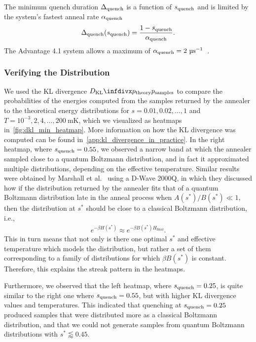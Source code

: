 The minimum quench duration \( \Delta_{\text{quench}} \) is a function of \( s_{\text{quench}} \) and is limited by the system's fastest anneal rate \( \alpha_{\text{quench}} \)
\begin{align}
    \Delta_{\text{quench}}(s_{\text{quench}}) = \frac{1 - s_{\text{quench}}}{\alpha_{\text{quench}}}.
\end{align}
The Advantage 4.1 system allows a maximum of \( \alphaquench = 2 \ \si{\micro\second}^{-1} \)~\cite{dwave_solver_parameters}.

\subsubsection{Verifying the Distribution}
We used the KL divergence \( \DKL{\ptheory}{\psamples} \) to compare the probabilities of the energies computed from the samples returned by the annealer to the theoretical energy distributions for \( s = 0.01, 0.02, \dots, 1 \) and \( T = 10^{-3}, 2, 4, \dots, 200 \ \si{\milli\kelvin} \), which we visualized as heatmaps in~\cref{fig:dkl_min_heatmap}.
More information on how the KL divergence was computed can be found in~\cref{app:kl_divergence_in_practice}.
In the right heatmap, where \( s_{\text{quench}} = 0.55 \), we observed a narrow band at which the annealer sampled close to a quantum Boltzmann distribution, and in fact it approximated multiple distributions, depending on the effective temperature.
Similar results were obtained by Marshall et al.~\cite{marshall_2019} using a D-Wave 2000Q, in which they discussed how if the distribution returned by the annealer fits that of a quantum Boltzmann distribution late in the anneal process when \( A(s^*) / B(s^*) \ll 1 \), then the distribution at \( s^* \) should be close to a classical Boltzmann distribution, i.e.,
\begin{align}
    e^{-\beta H(s^*)} \approx e^{-\beta B(s^*) H_\text{final}}.
\end{align}
This in turn means that not only is there one optimal \( s^* \) and effective temperature which models the distribution, but rather a set of them corresponding to a family of distributions for which \( \beta B(s^*) \) is constant.
Therefore, this explains the streak pattern in the heatmaps.

Furthermore, we observed that the left heatmap, where \( s_{\text{quench}} = 0.25 \), is quite similar to the right one where \( s_{\text{quench}} = 0.55 \), but with higher KL divergence values and temperatures.
This indicated that quenching at \( s_{\text{quench}} = 0.25 \) produced samples that were distributed more as a classical Boltzmann distribution, and that we could not generate samples from quantum Boltzmann distributions with \( s^* \lessapprox 0.45 \).

